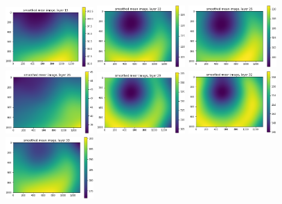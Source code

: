 \documentclass[letterpaper,11pt]{article}
\begin{document}
\begin{figure}[!ht]
\includegraphics[width=0.3\textwidth]{images/results/smoothed_mean_image_layers/smoothed_mean_image_layer_19}
\includegraphics[width=0.3\textwidth]{images/results/smoothed_mean_image_layers/smoothed_mean_image_layer_22}
\includegraphics[width=0.3\textwidth]{images/results/smoothed_mean_image_layers/smoothed_mean_image_layer_25}
\includegraphics[width=0.3\textwidth]{images/results/smoothed_mean_image_layers/smoothed_mean_image_layer_26}
\includegraphics[width=0.3\textwidth]{images/results/smoothed_mean_image_layers/smoothed_mean_image_layer_29}
\includegraphics[width=0.3\textwidth]{images/results/smoothed_mean_image_layers/smoothed_mean_image_layer_32}
\includegraphics[width=0.3\textwidth]{images/results/smoothed_mean_image_layers/smoothed_mean_image_layer_33}

\end{figure}
\end{document}
